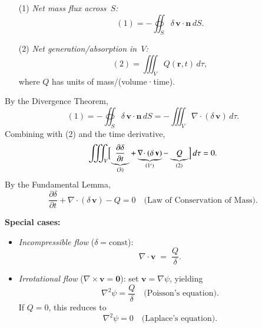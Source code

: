 \documentclass{report}
\begin{document}
\begin{enumerate}
  \item[(1)] \emph{Net mass flux across~$S$:}
  \[
    (1)
    = -\oiint_S \delta\,\mathbf v\!\cdot\!\mathbf n \,dS.
  \]
  \begin{center}
  \end{center}

  \item[(2)] \emph{Net generation/absorption in~$V$:}
  \[
    (2)
    = \iiint_V Q(\mathbf r, t)\,d\tau,
  \]
  where $Q$ has units of mass/(volume·time).
\end{enumerate}

\noindent By the Divergence Theorem,
\[
(1)
= -\oiint_S \delta\,\mathbf v\!\cdot\!\mathbf n \,dS
= -\iiint_V \nabla\!\cdot(\delta\,\mathbf v)\,d\tau.
\]
Combining with (2) and the time derivative,
\[
\iiint_V
\Bigl[
\underbrace{\frac{\partial\delta}{\partial t}}_{(3)}
+ \underbrace{\nabla\!\cdot(\delta\,\mathbf v)}_{(1')}
- \underbrace{Q}_{(2)}
\Bigr]
\,d\tau
=0.
\]
By the Fundamental Lemma,
\[
\frac{\partial\delta}{\partial t}
+ \nabla\!\cdot(\delta\,\mathbf v)
- Q = 0
\quad\text{(Law of Conservation of Mass).}
\]

\medskip
\noindent\textbf{Special cases:}
\begin{itemize}
  \item \emph{Incompressible flow} ($\delta=\mathrm{const}$):
    \[
      \nabla\!\cdot\mathbf v \;=\; \frac{Q}{\delta}.
    \]
  \item \emph{Irrotational flow} ($\nabla\times\mathbf v=\mathbf0$):
    set $\mathbf v=\nabla\psi$, yielding
    \[
      \nabla^2\psi = \frac{Q}{\delta}
      \quad\text{(Poisson's equation).}
    \]
    If $Q=0$, this reduces to
    \[
      \nabla^2\psi = 0
      \quad\text{(Laplace's equation).}
    \]
\end{itemize}
\end{document}
